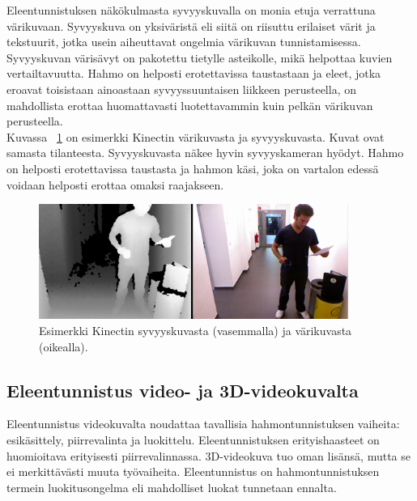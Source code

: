 Eleentunnistuksen näkökulmasta syvyyskuvalla on monia etuja verrattuna värikuvaan. Syvyyskuva on yksiväristä
eli siitä on riisuttu erilaiset värit ja tekstuurit, jotka usein aiheuttavat ongelmia värikuvan tunnistamisessa.
Syvyyskuvan värisävyt on pakotettu tietylle asteikolle, mikä helpottaa kuvien vertailtavuutta. \citep{5995316} Hahmo on helposti erotettavissa
taustastaan ja eleet, jotka eroavat toisistaan ainoastaan syvyyssuuntaisen liikkeen perusteella, 
on mahdollista erottaa huomattavasti luotettavammin kuin pelkän värikuvan perusteella.\\
 
Kuvassa ~\ref{fig:kinectkuva} on esimerkki Kinectin värikuvasta ja syvyyskuvasta. Kuvat ovat samasta tilanteesta.
Syvyyskuvasta näkee hyvin syvyyskameran hyödyt. Hahmo on helposti erotettavissa taustasta ja hahmon käsi, 
joka on vartalon edessä voidaan helposti erottaa omaksi raajakseen. \\

\begin{figure}[htb]
  \begin{center}
    \includegraphics[width=0.9\textwidth]{kinect1_cropped-1024x382.png}
    \caption{Esimerkki Kinectin syvyyskuvasta (vasemmalla) ja värikuvasta (oikealla). \citep {kinectkuva}}
    \label{fig:kinectkuva}
  \end{center}
\end{figure}

\subsection{Eleentunnistus video- ja 3D-videokuvalta}

Eleentunnistus videokuvalta noudattaa tavallisia hahmontunnistuksen vaiheita: esikäsittely, piirrevalinta ja
luokittelu. Eleentunnistuksen erityishaasteet on huomioitava erityisesti piirrevalinnassa. 3D-videokuva tuo 
oman lisänsä, mutta se ei merkittävästi muuta työvaiheita. Eleentunnistus on hahmontunnistuksen termein
luokitusongelma eli mahdolliset luokat tunnetaan ennalta. \citep{6239178}  \\

